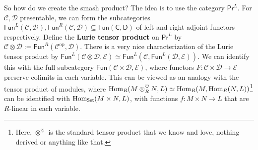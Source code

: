 So how do we create the smash product? The idea is to use the category $\mathsf{Pr} ^L$. For $\mathcal{C,D} $ presentable, we can form the subcategories $\mathsf{Fun} ^L(\mathcal{C,D} ) ,\mathsf{Fun} ^R(\mathcal{C,D} )\subseteq \mathsf{Fun} (\mathsf{C,D} )$ of left and right adjoint functors respectively. Define the \textbf{Lurie tensor product} on $\mathsf{Pr} ^L$ by $\mathcal{C} \otimes \mathcal{D} := \mathsf{Fun} ^R(\mathcal{C} ^{\mathrm{op}},\mathcal{D} )$. There is a very nice characterization of the Lurie tensor product by $\mathsf{Fun} ^L(\mathcal{C} \otimes \mathcal{D,E})\simeq \mathsf{Fun} ^L(\mathcal{C} ,\mathsf{Fun} ^L(\mathcal{D,E} ))$. We can identify this with the full subcategory $\mathsf{Fun} (\mathcal{C} \times \mathcal{D,E} )$, where functors $F \colon \mathcal{C} \times \mathcal{D}  \to \mathcal{E} $ preserve colimits in each variable. This can be viewed as an analogy with the tensor product of modules, where $\operatorname{Hom} _R(M \otimes _R ^{\heartsuit}  N,L) \simeq \operatorname{Hom}_R(M,\operatorname{Hom}_R(N,L))$\footnote{Here, $\otimes ^{\heartsuit}$ is the standard tensor product that we know and love, nothing derived or anything like that.} can be identified with $\operatorname{Hom} _{\mathsf{Set} }(M \times N,L)$, with functions $f \colon M \times N \to L$ that are $R$-linear in each variable.

